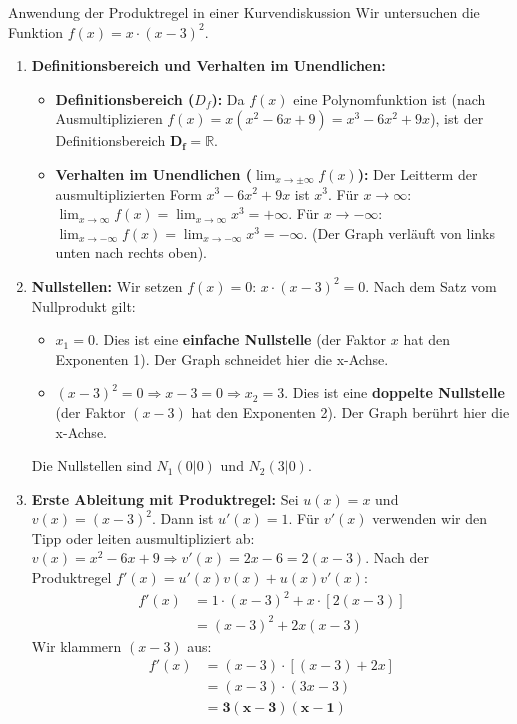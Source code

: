 \begin{loesungsumgebung}{Anwendung der Produktregel in einer Kurvendiskussion}
Wir untersuchen die Funktion $f(x) = x \cdot (x-3)^2$.

\begin{enumerate}[label=(\alph*)]
    \item \textbf{Definitionsbereich und Verhalten im Unendlichen:}
    \begin{itemize}
        \item \textbf{Definitionsbereich ($D_f$):} Da $f(x)$ eine Polynomfunktion ist (nach Ausmultiplizieren $f(x) = x(x^2-6x+9) = x^3-6x^2+9x$), ist der Definitionsbereich $\mathbf{D_f = \mathbb{R}}$.
        \item \textbf{Verhalten im Unendlichen ($\lim_{x \to \pm\infty} f(x)$):}
        Der Leitterm der ausmultiplizierten Form $x^3-6x^2+9x$ ist $x^3$.
        Für $x \to \infty$: $\lim_{x \to \infty} f(x) = \lim_{x \to \infty} x^3 = \mathbf{+\infty}$.
        Für $x \to -\infty$: $\lim_{x \to -\infty} f(x) = \lim_{x \to -\infty} x^3 = \mathbf{-\infty}$.
        (Der Graph verläuft von links unten nach rechts oben).
    \end{itemize}

    \item \textbf{Nullstellen:}
    Wir setzen $f(x)=0$: $x \cdot (x-3)^2 = 0$.
    Nach dem Satz vom Nullprodukt gilt:
    \begin{itemize}
        \item $x_1 = 0$. Dies ist eine \textbf{einfache Nullstelle} (der Faktor $x$ hat den Exponenten 1). Der Graph schneidet hier die x-Achse.
        \item $(x-3)^2 = 0 \Rightarrow x-3=0 \Rightarrow x_2 = 3$. Dies ist eine \textbf{doppelte Nullstelle} (der Faktor $(x-3)$ hat den Exponenten 2). Der Graph berührt hier die x-Achse.
    \end{itemize}
    Die Nullstellen sind $N_1(0|0)$ und $N_2(3|0)$.

    \item \textbf{Erste Ableitung mit Produktregel:}
    Sei $u(x)=x$ und $v(x)=(x-3)^2$.
    Dann ist $u'(x)=1$.
    Für $v'(x)$ verwenden wir den Tipp oder leiten ausmultipliziert ab: $v(x) = x^2-6x+9 \Rightarrow v'(x) = 2x-6 = 2(x-3)$.
    Nach der Produktregel $f'(x) = u'(x)v(x) + u(x)v'(x)$:
    \begin{align*}
    f'(x) &= 1 \cdot (x-3)^2 + x \cdot [2(x-3)] \\
          &= (x-3)^2 + 2x(x-3)
    \end{align*}
    Wir klammern $(x-3)$ aus:
    \begin{align*}
    f'(x) &= (x-3) \cdot [(x-3) + 2x] \\
          &= (x-3) \cdot (3x-3) \\
          &= \mathbf{3(x-3)(x-1)}
    \end{align*}


\end{enumerate}
\end{loesungsumgebung}
